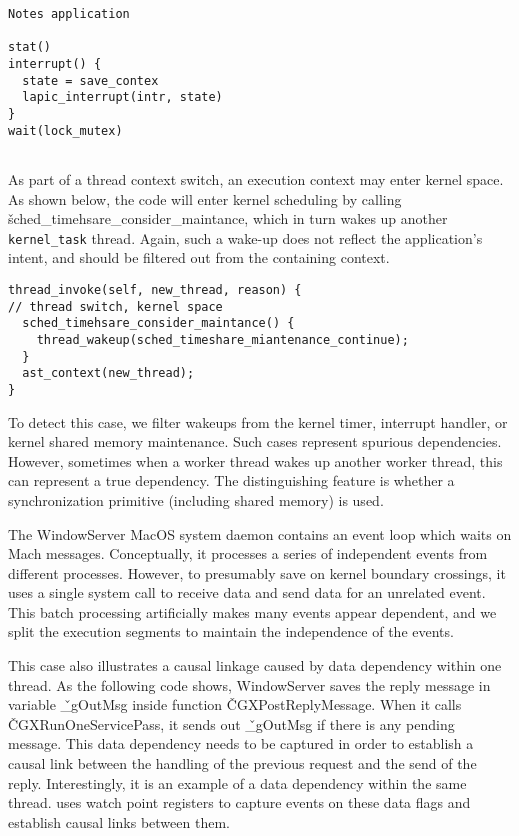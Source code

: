 {\footnotesize \begin{verbatim}
Notes application

stat()
interrupt() {
  state = save_contex  
  lapic_interrupt(intr, state)
}
wait(lock_mutex)


\end{verbatim}
}

As part of a thread context switch, an execution context may enter kernel
space. As shown below, the code will enter kernel scheduling by calling
\v{sched\_timehsare\_consider\_maintance}, which in turn wakes up another
\texttt{kernel\_task} thread.  Again, such a wake-up does not reflect the application's intent, and should be filtered out from the containing context.  

{\footnotesize \begin{verbatim}
thread_invoke(self, new_thread, reason) {
// thread switch, kernel space
  sched_timehsare_consider_maintance() {
    thread_wakeup(sched_timeshare_miantenance_continue);
  }
  ast_context(new_thread);
}
\end{verbatim}
}

To detect this case, we filter wakeups from the kernel timer, interrupt
handler, or kernel shared memory maintenance. Such cases represent spurious
dependencies. However, sometimes when a worker thread wakes up another worker
thread, this can represent a true dependency. The distinguishing feature is
whether a synchronization primitive (including shared memory) is used.

The WindowServer MacOS system daemon contains an event loop which waits on Mach
messages. Conceptually, it processes a series of independent events from
different processes. However, to presumably save on kernel boundary crossings, it uses a
single system call to receive data and send data for an unrelated
event. This batch processing artificially makes many events appear dependent, and we split
the execution segments to maintain the independence of the events.

This case also illustrates a causal linkage caused by data dependency
within one thread.  As the following code shows, WindowServer saves the
reply message in variable \v{\_gOutMsg} inside function
\v{CGXPostReplyMessage}.  When it calls \v{CGXRunOneServicePass}, it sends
out \v{\_gOutMsg} if there is any pending message.  This data dependency
needs to be captured in order to establish a causal link between the
handling of the previous request and the send of the reply.
Interestingly, it is an example of a data dependency within the same
thread.  \xxx uses watch point registers to capture events on these data
flags and establish causal links between them.

